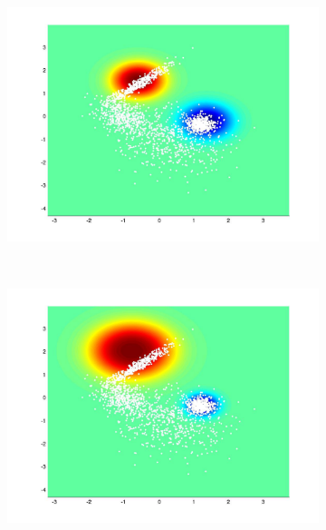 \documentclass[useAMS,usenatbib,fleqn]{mn2e}
\begin{document}
\begin{figure}
         \begin{subfigure}[b]{90 px}
                \includegraphics[trim = 150px 100px 150px 70px, clip=true,width=\textwidth]{global2.jpg}
        \end{subfigure}
        ~
         \begin{subfigure}[b]{90 px}
                \includegraphics[trim = 150px 100px 150px 70px, clip=true,width=\textwidth]{VL2.jpg}
        \end{subfigure}
        ~
        \begin{subfigure}[b]{90 px}

\end{subfigure}
\end{figure}
\end{document}
